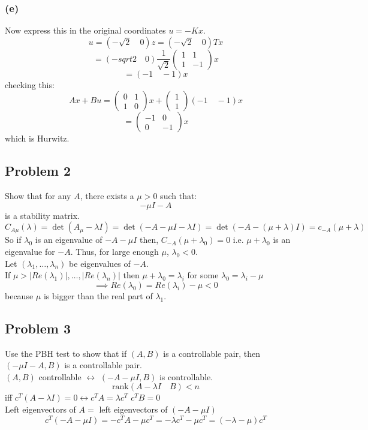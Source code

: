 \documentclass{article}
\begin{document}
\subsubsection*{(e)}
Now express this in the original coordinates $u=-Kx$.\\
\[u=(-\sqrt{2}\quad 0)z=(-\sqrt{2}\quad 0)Tx\]
\[=(-sqrt{2}\quad 0)\frac{1}{\sqrt{2}}\begin{pmatrix}1&1\\1&-1\end{pmatrix}x\]
\[=(-1\quad -1)x\]
checking this:
\[Ax+Bu=\begin{pmatrix}0&1\\1&0\end{pmatrix}x+\begin{pmatrix}1\\1\end{pmatrix}(-1\quad -1)x\]
\[=\begin{pmatrix}-1 & 0\\0&-1\end{pmatrix}x\]
which is Hurwitz.

\subsection*{Problem 2}
Show that for any $A$, there exists a $\mu>0$ such that:
\[-\mu I-A\]
is a stability matrix.\\
\[C_{A\mu}(\lambda)=\det(A_\mu-\lambda I)=\det (-A-\mu I-\lambda I)=\det(-A-(\mu+\lambda)I)=c_{-A}(\mu+\lambda)\]
So if $\lambda_0$ is an eigenvalue of $-A-\mu I$ then, $C_{-A}(\mu+\lambda_0)=0$ i.e. $\mu+\lambda_0$ is an eigenvalue for $-A$. Thus, for large enough $\mu$, $\lambda_0<0$.\\
Let $(\lambda_1,\dots,\lambda_n)$ be eigenvalues of $-A$.\\
If $\mu>\lvert Re(\lambda_1)\rvert,\dots,\lvert Re(\lambda_n)\rvert$ then $\mu+\lambda_0=\lambda_i$ for some $\lambda_0=\lambda_i-\mu$\\
\[\implies Re(\lambda_0)=Re(\lambda_i)-\mu<0\]
because $\mu$ is bigger than the real part of $\lambda_1$.\\

\subsection*{Problem 3}
Use the PBH test to show that if $(A,B)$ is a controllable pair, then $(-\mu I-A, B)$ is a controllable pair.\\
$(A,B)$ controllable $\leftrightarrow$ $(-A-\mu I, B)$ is controllable.
\[\text{rank}(A-\lambda I\quad B)<n\]
iff $c^T(A-\lambda I)=0\leftrightarrow c^TA=\lambda c^T$ $c^TB=0$\\
Left eigenvectors of $A=$ left eigenvectors of $(-A-\mu I)$\\
\[c^T(-A-\mu I)=-c^TA-\mu c^T=-\lambda c^T-\mu c^T=(-\lambda-\mu)c^T\]
\end{document}
